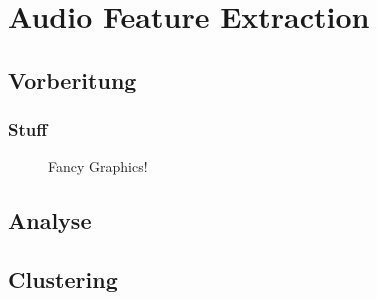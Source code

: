 \chapter{Audio Feature Extraction}


\section{Vorberitung}
\label{sec:preperation}

\subsection{Stuff}
\begin{figure}[H]
    \center
    \caption{Fancy Graphics!}
    \label{fig:im}
\end{figure}




\section{Analyse}
\label{sec:analyse}




\section{Clustering}
\label{sec:cluster}